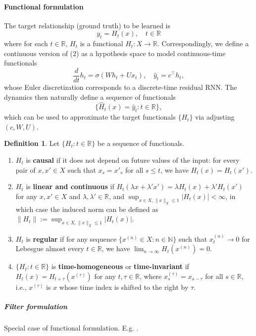 \documentclass{article}
\theoremstyle{definition}
\newtheorem{definition}{Definition}
\theoremstyle{remark}
\begin{document}
\paragraph{Functional formulation} 
The target relationship (ground truth) to be learned is 
\[
y_t = H_t(x), \quad t \in \mathbb{R}
\]
where for each $t \in \mathbb{R}$, $H_t$ is a functional $H_t : X \to \mathbb{R}$. Correspondingly, we define a continuous version of (2) as a hypothesis space to model continuous-time functionals
\[
\frac{d}{dt} h_t = \sigma(W h_t + U x_t), \quad \hat{y}_t = c^\top h_t,
\]
whose Euler discretization corresponds to a discrete-time residual RNN. The dynamics then naturally define a sequence of functionals 
\[
\{\hat{H}_t(x) = \hat{y}_t : t \in \mathbb{R}\},
\]
which can be used to approximate the target functionals $\{H_t\}$ via adjusting $(c, W, U)$.


\begin{definition}
Let $\{H_t : t \in \mathbb{R}\}$ be a sequence of functionals.
\begin{enumerate}
    \item $H_t$ is \textbf{causal} if it does not depend on future values of the input: for every pair of $x, x' \in X$ such that $x_s = x'_s$ for all $s \leq t$, we have $H_t(x) = H_t(x')$.
    
    \item $H_t$ is \textbf{linear and continuous} if $H_t(\lambda x + \lambda' x') = \lambda H_t(x) + \lambda' H_t(x')$ for any $x, x' \in X$ and $\lambda, \lambda' \in \mathbb{R}$, and $\sup_{x \in X, \|x\|_X \leq 1} |H_t(x)| < \infty$, in which case the induced norm can be defined as $\|H_t\| := \sup_{x \in X, \|x\|_X \leq 1} |H_t(x)|$.
    
    \item $H_t$ is \textbf{regular} if for any sequence $\{x^{(n)} \in X : n \in \mathbb{N}\}$ such that $x^{(n)}_t \to 0$ for Lebesgue almost every $t \in \mathbb{R}$, we have $\lim_{n \to \infty} H_t(x^{(n)}) = 0$.
    
    \item $\{H_t : t \in \mathbb{R}\}$ is \textbf{time-homogeneous} or \textbf{time-invariant} if $H_t(x) = H_{t+\tau}(x^{(\tau)})$ for any $t, \tau \in \mathbb{R}$, where $x^{(\tau)}_s = x_{s-\tau}$ for all $s \in \mathbb{R}$, i.e., $x^{(\tau)}$ is $x$ whose time index is shifted to the right by $\tau$.
\end{enumerate}
\end{definition}

\subparagraph{Filter formulation}
Special case of functional formulation.
E.g. \citet{grigoryeva2018universal}.
\end{document}
